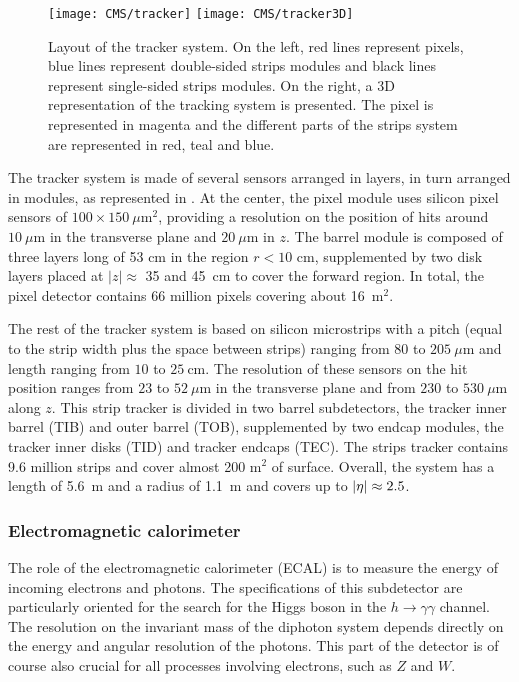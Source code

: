     \begin{figure}[h!]
        \centering
        \texttt{[image: CMS/tracker]}
        \texttt{[image: CMS/tracker3D]}
        \caption{Layout of the tracker system.
        On the left, red lines represent pixels, blue lines represent double-sided
        strips modules and black lines represent single-sided strips modules. On the
        right, a 3D representation of the tracking system is presented. The pixel
        is represented in magenta and the different parts of the strips system are
        represented in red, teal and blue.}
        \label{fig:CMS/tracker}
    \end{figure}

    The tracker system is made of several sensors arranged in layers, in turn arranged
    in modules, as represented in . At the center, the pixel module
    uses silicon pixel sensors of $100 \times 150~\mu\text{m}^2$, providing a resolution
    on the position of hits around $10~\mu\text{m}$ in the transverse plane and
    $20~\mu\text{m}$ in $z$. The barrel module is composed of three layers long of 53 cm in the
    region $r < 10$ cm, supplemented by two disk layers placed at $\left|z\right| \approx$
    35 and 45~cm to cover the forward region. In total, the pixel detector contains 66
    million pixels covering about 16~m$^2$.

    The rest of the tracker system is based on silicon microstrips with a pitch (equal
    to the strip width plus the space between strips) ranging
    from $80$ to $205~\mu\text{m}$ and length ranging from $10$ to $25~\text{cm}$.
    The resolution of these sensors on the hit position ranges from $23$ to $52~\mu\text{m}$
    in the transverse plane and from $230$ to $530~\mu\text{m}$ along $z$.
    This strip tracker is divided in two barrel subdetectors, the tracker inner barrel
    (TIB) and outer barrel (TOB), supplemented by two endcap modules, the tracker inner
    disks (TID) and tracker endcaps (TEC). The strips tracker contains 9.6 million strips
    and cover almost 200 m$^2$ of surface. Overall, the system has a length of 5.6~m
    and a radius of 1.1~m and covers up to $\left| \eta \right| \approx 2.5$.

        \subsubsection{Electromagnetic calorimeter}

    The role of the electromagnetic calorimeter (ECAL) is to measure the energy of incoming electrons
    and photons. The specifications of this subdetector are particularly oriented for
    the search for the Higgs boson in the $h \rightarrow \gamma \gamma$ channel. The resolution on the
    invariant mass of the diphoton system depends directly on the energy and angular
    resolution of the photons. This part of the detector is of course also crucial for
    all processes involving electrons, such as $Z$ and $W$.

